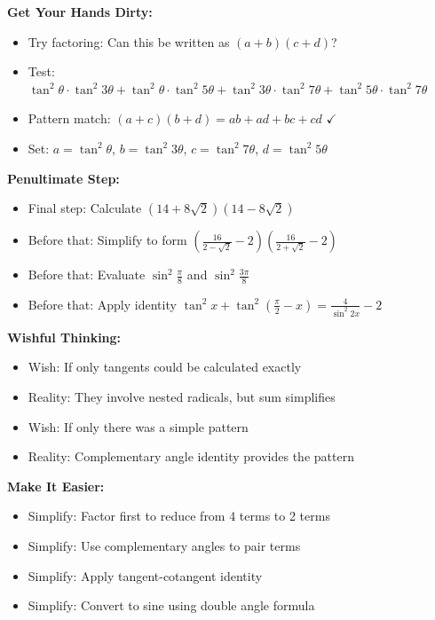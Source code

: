 \documentclass[12pt]{article}
\begin{document}
\begin{strategicbox}
\textbf{Get Your Hands Dirty:}
\begin{itemize}
    \item Try factoring: Can this be written as $(a+b)(c+d)$?
    \item Test: $\tan^2 \theta \cdot \tan^2 3\theta + \tan^2 \theta \cdot \tan^2 5\theta + \tan^2 3\theta \cdot \tan^2 7\theta + \tan^2 5\theta \cdot \tan^2 7\theta$
    \item Pattern match: $(a+c)(b+d) = ab + ad + bc + cd$ $\checkmark$
    \item Set: $a = \tan^2 \theta$, $b = \tan^2 3\theta$, $c = \tan^2 7\theta$, $d = \tan^2 5\theta$
\end{itemize}

\textbf{Penultimate Step:}
\begin{itemize}
    \item Final step: Calculate $(14 + 8\sqrt{2})(14 - 8\sqrt{2})$
    \item Before that: Simplify to form $\left(\frac{16}{2-\sqrt{2}}-2\right)\left(\frac{16}{2+\sqrt{2}}-2\right)$
    \item Before that: Evaluate $\sin^2\frac{\pi}{8}$ and $\sin^2\frac{3\pi}{8}$
    \item Before that: Apply identity $\tan^2 x + \tan^2(\frac{\pi}{2}-x) = \frac{4}{\sin^2 2x} - 2$
\end{itemize}

\textbf{Wishful Thinking:}
\begin{itemize}
    \item Wish: If only tangents could be calculated exactly
    \item Reality: They involve nested radicals, but sum simplifies
    \item Wish: If only there was a simple pattern
    \item Reality: Complementary angle identity provides the pattern
\end{itemize}

\textbf{Make It Easier:}
\begin{itemize}
    \item Simplify: Factor first to reduce from 4 terms to 2 terms
    \item Simplify: Use complementary angles to pair terms
    \item Simplify: Apply tangent-cotangent identity
    \item Simplify: Convert to sine using double angle formula
\end{itemize}


\end{strategicbox}
\end{document}
